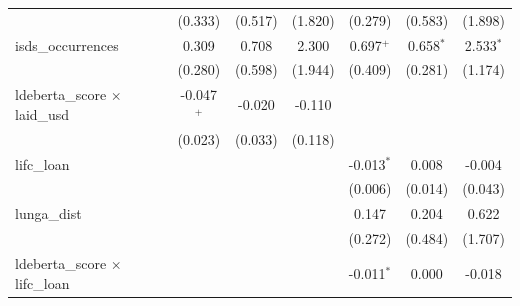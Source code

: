 \begin{tabular}{lcccccc}
                                          & (0.333)                                     & (0.517)                   & (1.820)                       & (0.279)                                     & (0.583)                   & (1.898)\\   
   isds\_occurrences                      & 0.309                                       & 0.708                     & 2.300                         & 0.697$^{+}$                                 & 0.658$^{*}$               & 2.533$^{*}$\\   
                                          & (0.280)                                     & (0.598)                   & (1.944)                       & (0.409)                                     & (0.281)                   & (1.174)\\   
   ldeberta\_score $\times$ laid\_usd     & -0.047$^{+}$                                & -0.020                    & -0.110                        &                                             &                           &   \\   
                                          & (0.023)                                     & (0.033)                   & (0.118)                       &                                             &                           &   \\   
   lifc\_loan                             &                                             &                           &                               & -0.013$^{*}$                                & 0.008                     & -0.004\\   
                                          &                                             &                           &                               & (0.006)                                     & (0.014)                   & (0.043)\\   
   lunga\_dist                            &                                             &                           &                               & 0.147                                       & 0.204                     & 0.622\\   
                                          &                                             &                           &                               & (0.272)                                     & (0.484)                   & (1.707)\\   
   ldeberta\_score $\times$ lifc\_loan    &                                             &                           &                               & -0.011$^{*}$                                & 0.000                     & -0.018\\   

\end{tabular}
